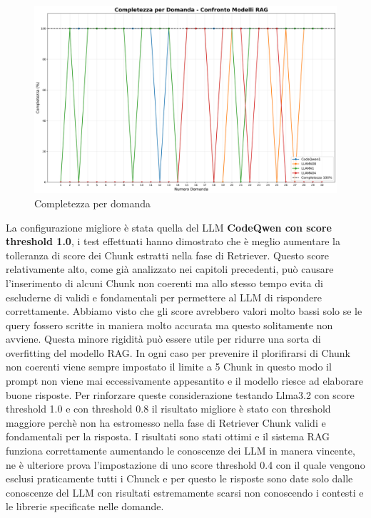 \documentclass[12pt,a4paper,openright,twoside]{book}
\begin{document}
\begin{figure}[h]
    \centering
    \includegraphics[width=\textwidth]{completezza_per_domanda.png}
    \caption{Completezza per domanda}
    \label{fig:completezza-per-domanda}
\end{figure}
La configurazione migliore è stata quella del LLM \textbf{CodeQwen con score threshold 1.0},
i test effettuati hanno dimostrato che è meglio aumentare la tolleranza di score dei Chunk estratti nella fase di Retriever.
Questo score relativamente alto, come già analizzato nei capitoli precedenti, può causare l'inserimento di alcuni Chunk non coerenti ma allo stesso tempo evita di escluderne di validi e fondamentali per permettere al LLM di rispondere correttamente.
Abbiamo visto che gli score avrebbero valori molto bassi solo se le query fossero scritte in maniera molto accurata ma questo solitamente non avviene.
Questa minore rigidità può essere utile per ridurre una sorta di overfitting del modello RAG.
In ogni caso per prevenire il plorifirarsi di Chunk non coerenti viene sempre impostato il limite a 5 Chunk in questo modo il prompt non viene mai eccessivamente appesantito e il modello riesce ad elaborare buone risposte.
Per rinforzare queste considerazione testando Llma3.2 con score threshold 1.0 e con threshold 0.8 il risultato migliore è stato con threshold maggiore perchè non ha estromesso nella fase di Retriever Chunk validi e fondamentali per la risposta.
I risultati sono stati ottimi e il sistema RAG funziona correttamente aumentando le conoscenze dei LLM in manera vincente,
ne è ulteriore prova l'impostazione di uno score threshold 0.4 con il quale vengono esclusi praticamente tutti i Chunck e per questo le risposte sono date solo dalle conoscenze del LLM con risultati estremamente scarsi non conoscendo i contesti e le librerie specificate nelle domande.
\end{document}
